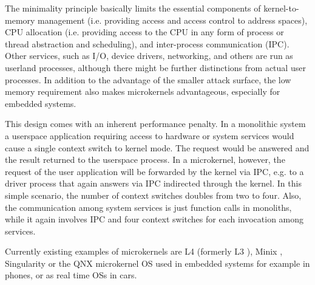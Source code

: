 The minimality principle basically limits the essential components of kernel-to-memory management (i.e. providing access and access control to address spaces), CPU allocation (i.e. providing access to the CPU in any form of process or thread abstraction and scheduling), and inter-process communication (IPC). Other services, such as I/O, device drivers, networking, and others are run as userland processes, although there might be further distinctions from actual user processes. In addition to the advantage of the smaller attack surface, the low memory requirement also makes microkernels advantageous, especially for embedded systems. 

This design comes with an inherent performance penalty. In a monolithic system a userspace application requiring access to hardware or system services would cause a single context switch to kernel mode. The request would be answered and the result returned to the userspace process. In a microkernel, however, the request of the user application will be forwarded by the kernel via IPC, e.g. to a driver process that again answers via IPC indirected through the kernel. In this simple scenario, the number of context switches doubles from two to four. Also, the communication among system services is just function calls in monoliths, while it again involves IPC and four context switches for each invocation among services. 

Currently existing examples of microkernels are L4 (formerly L3 \cite{liedtke1993persistent}), Minix \cite{herder2006minix}, Singularity \cite{hunt2005overview} or the QNX microkernel OS\cite{hildebrand1992architectural} used in embedded systems for example in phones, or as real time OSs in cars.


